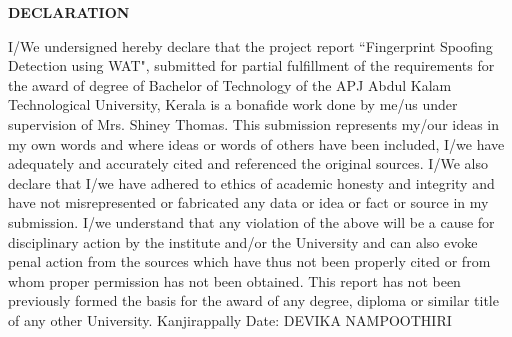 \begin{titlepage}
\begin{center} 
\textbf {\Large{DECLARATION}} 
\end{center}
I/We undersigned hereby declare that the project report ``Fingerprint Spoofing Detection using WAT", submitted for partial fulfillment of the requirements for the award of degree of Bachelor of Technology of
the APJ Abdul Kalam Technological University, Kerala is a bonafide work done by me/us
under supervision of Mrs. Shiney Thomas. This submission represents my/our ideas in
my own words and where ideas or words of others have been included, I/we have adequately
and accurately cited and referenced the original sources. I/We also declare that I/we have
adhered to ethics of academic honesty and integrity and have not misrepresented or
fabricated any data or idea or fact or source in my submission. I/we understand that any
violation of the above will be a cause for disciplinary action by the institute and/or the
University and can also evoke penal action from the sources which have thus not been
properly cited or from whom proper permission has not been obtained. This report has
not been previously formed the basis for the award of any degree, diploma or similar title
of any other University.
\vspace{20pt}
\newline  Kanjirappally
\vspace{1pt}
\newline Date: \hspace{320pt} 
\newline \vspace{1pt} \hspace{320pt} DEVIKA  NAMPOOTHIRI
\end{titlepage}